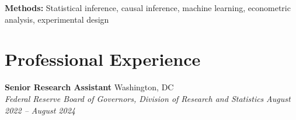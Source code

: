 \documentclass[11pt]{article}
\begin{document}
\medskip

\textbf{Methods:} Statistical inference, causal inference, machine learning, econometric analysis, experimental design

\section*{Professional Experience}

\textbf{Senior Research Assistant} \hfill Washington, DC\\
\textit{Federal Reserve Board of Governors, Division of Research and Statistics}
\hfill \textit{August 2022 -- August 2024}
\end{document}

